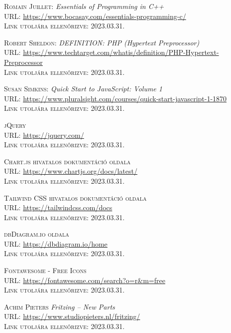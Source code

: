 \documentclass[
]{thesis-ekf}
\theoremstyle{definition}
\theoremstyle{remark}
\begin{document}
\begin{thebibliography}{20}
		\textsc{Romain Juillet:} \emph{Essentials of Programming in C++}\\
		\textsc{URL:} \url{https://www.bocasay.com/essentials-programming-c/}\\
		\textsc{Link utoljára ellenőrizve:} 2023.03.31.
		
		\textsc{Robert Sheldon:} \emph{DEFINITION: PHP (Hypertext Preprocessor)}\\
		\textsc{URL:} \url{https://www.techtarget.com/whatis/definition/PHP-Hypertext-Preprocessor}\\
		\textsc{Link utoljára ellenőrizve:} 2023.03.31.
		
		\textsc{Susan Simkins:} \emph{Quick Start to JavaScript: Volume 1}\\
		\textsc{URL:} \url{https://www.pluralsight.com/courses/quick-start-javascript-1-1870}\\
		\textsc{Link utoljára ellenőrizve:} 2023.03.31.
		
		\textsc{jQuery}\\
		\textsc{URL:} \url{https://jquery.com/}\\
		\textsc{Link utoljára ellenőrizve:} 2023.03.31.
		
		\textsc{Chart.js hivatalos dokumentáció oldala}\\
		\textsc{URL:} \url{https://www.chartjs.org/docs/latest/}\\
		\textsc{Link utoljára ellenőrizve:} 2023.03.31.
		
		\textsc{Tailwind CSS hivatalos dokumentáció oldala}\\
		\textsc{URL:} \url{https://tailwindcss.com/docs}\\
		\textsc{Link utoljára ellenőrizve:} 2023.03.31.
		
		\textsc{dbDiagram.io oldala}\\
		\textsc{URL:} \url{https://dbdiagram.io/home}\\
		\textsc{Link utoljára ellenőrizve:} 2023.03.31.
		
		\textsc{Fontawesome - Free Icons}\\
		\textsc{URL:} \url{https://fontawesome.com/search?o=r&m=free}\\
		\textsc{Link utoljára ellenőrizve:} 2023.03.31.
		
		\textsc{Achim Pieters} \emph{Fritzing – New Parts}\\
		\textsc{URL:} \url{https://www.studiopieters.nl/fritzing/}\\
		\textsc{Link utoljára ellenőrizve:} 2023.03.31.
		

\end{thebibliography}
\end{document}
